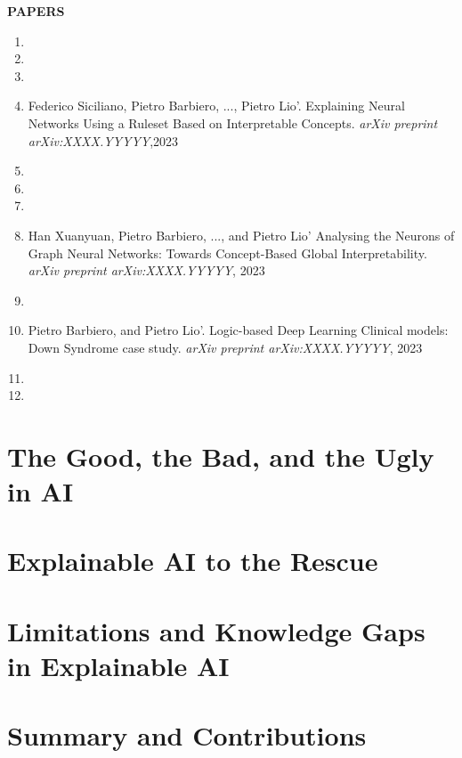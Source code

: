 \documentclass[withindex,glossary]{cam-thesis}
\begin{document}
\textbf{PAPERS}
\nobibliography*
\begin{enumerate}
    \item {}
    \item {}
    \item {}
    \item Federico Siciliano, Pietro Barbiero, ..., Pietro Lio'. Explaining Neural Networks Using a Ruleset Based on Interpretable Concepts. \textit{arXiv preprint arXiv:XXXX.YYYYY},2023
    \item {}
    \item {}
    \item {}
    \item Han Xuanyuan, Pietro Barbiero, ..., and Pietro Lio' Analysing the Neurons of Graph Neural Networks: Towards Concept-Based Global Interpretability. \textit{arXiv preprint arXiv:XXXX.YYYYY}, 2023
    \item {}
    \item Pietro Barbiero, and Pietro Lio'. Logic-based Deep Learning Clinical models: Down Syndrome case study. \textit{arXiv preprint arXiv:XXXX.YYYYY}, 2023
    \item {}
    \item {}
\end{enumerate}

\section{The Good, the Bad, and the Ugly in AI}

\section{Explainable AI to the Rescue}

\section{Limitations and Knowledge Gaps in Explainable AI}

\section{Summary and Contributions}


\end{document}
